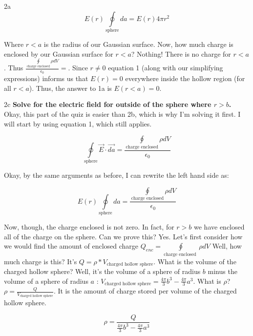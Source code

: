 \begin{homeworkProblem}[Quiz 3, Pr. 2]
\begin{homeworkSection}{2a}
        \[
        E(r) \oint\limits_{\text{sphere}} da = E(r) 4\pi r^2
        \]

        Where $r<a$ is the radius of our Gaussian surface. Now, how much
        charge is enclosed by our Gaussian surface for $r<a$? Nothing!
        There is no charge for $r<a$. Thus
        $\frac{\oint\limits_{\text{charge enclosed}}\rho dV}{\epsilon_0} = $.
        Since $r \ne 0$ equation 1 (along with our simplifying
        expressions) informs us that $E(r)=0$ everywhere inside the
        hollow region (for all $r<a$). Thus, the answer to 1a is $E(r<a)
        = 0$.

    \end{homeworkSection}
    \begin{homeworkSection}{2c}
        \textbf{Solve for the electric field for outside of the sphere
        where $r>b$.}
        \\

        Okay, this part of the quiz is easier than 2b, which is why I'm
        solving it first. I will start by using equation 1, which still
        applies.
        
        \[
            \oint\limits_{\text{sphere}} \vec{E}\cdot\vec{da} =
            \frac{\oint\limits_{\text{charge enclosed}}\rho dV}{\epsilon_0}
        \]

        Okay, by the same arguments as before, I can rewrite the left
        hand side as:

        \[
            E(r)\oint\limits_{\text{sphere}} da =
            \frac{\oint\limits_{\text{charge enclosed}}\rho dV}{\epsilon_0}
        \]

        Now, though, the charge enclosed is not zero. In fact, for $r>b$
        we have enclosed all of the charge on the sphere. Can we prove
        this? Yes. Let's first consider how we would find the amount of
        enclosed charge $Q_{enc} = \oint\limits_{\text{charge enclosed
        }}\rho dV$ Well, how much charge is this? It's
        $Q = \rho * V_{\text{charged hollow sphere}}$.        What is
        the volume of the charged hollow sphere? Well, it's the volume
        of a sphere of radius $b$ minus the volume of a sphere of radius
        $a$ : $V_{\text{charged hollow sphere}} = \frac{4\pi}{3}b^3 -
        \frac{4\pi}{3}a^3$. What is $\rho$? $\rho =
        \frac{Q}{V_{\text{charged hollow sphere}}}$. It is the amount of
        charge stored per volume of the charged hollow sphere.
    
        \[
        \rho = \frac{Q}{\frac{4\pi}{3}b^3 - \frac{4\pi}{3}a^3}
        \]


\end{homeworkSection}
\end{homeworkProblem}
